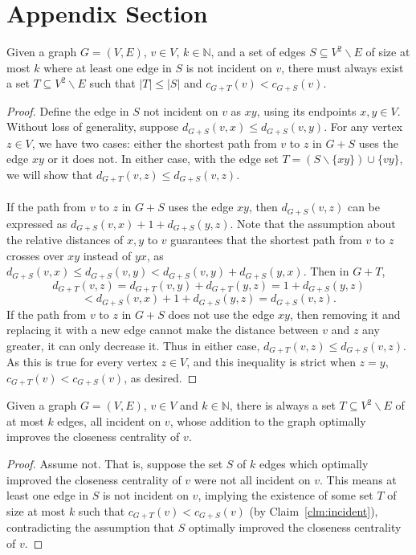 \section{Appendix Section}
\begin{claim} \label{clm:incident}
    Given a graph $G=(V,E)$, $v\in V$, $k\in\mathbb{N}$, and a set of edges $S\subseteq V^2\backslash E$ of size at most $k$ where at least one edge in $S$ is not incident on $v$, there must always exist a set $T\subseteq V^2\backslash E$ such that $|T|\leq|S|$ and $c_{G+T}(v)<c_{G+S}(v)$.
\end{claim}
\begin{proof}
    Define the edge in $S$ not incident on $v$ as $xy$, using its endpoints $x,y\in V$. Without loss of generality, suppose $d_{G+S}(v,x)\leq d_{G+S}(v,y)$. For any vertex $z\in V$, we have two cases: either the shortest path from $v$ to $z$ in $G+S$ uses the edge $xy$ or it does not. In either case, with the edge set $T=(S\backslash\{xy\})\cup\{vy\}$, we will show that $d_{G+T}(v,z)\leq d_{G+S}(v,z)$.\\\\
    If the path from $v$ to $z$ in $G+S$ uses the edge $xy$, then $d_{G+S}(v,z)$ can be expressed as $d_{G+S}(v,x)+1+d_{G+S}(y,z)$. Note that the assumption about the relative distances of $x,y$ to $v$ guarantees that the shortest path from $v$ to $z$ crosses over $xy$ instead of $yx$, as $d_{G+S}(v,x)\leq d_{G+S}(v,y)<d_{G+S}(v,y)+d_{G+S}(y,x)$. Then in $G+T$,
    \[d_{G+T}(v,z)=d_{G+T}(v,y)+d_{G+T}(y,z)=1+d_{G+S}(y,z)\]\[<d_{G+S}(v,x)+1+d_{G+S}(y,z)=d_{G+S}(v,z).\]
    If the path from $v$ to $z$ in $G+S$ does not use the edge $xy$, then removing it and replacing it with a new edge cannot make the distance between $v$ and $z$ any greater, it can only decrease it. Thus in either case, $d_{G+T}(v,z)\leq d_{G+S}(v,z)$. As this is true for every vertex $z\in V$, and this inequality is strict when $z=y$, $c_{G+T}(v)<c_{G+S}(v)$, as desired.
\end{proof}

\begin{lemma} \label{lem:incident}
    Given a graph $G=(V,E)$, $v\in V$ and $k\in\mathbb{N}$, there is always a set $T\subseteq V^2\backslash E$ of at most $k$ edges, all incident on $v$, whose addition to the graph optimally improves the closeness centrality of $v$.  
\end{lemma}
\begin{proof}
    Assume not. That is, suppose the set $S$ of $k$ edges which optimally improved the closeness centrality of $v$ were not all incident on $v$. This means at least one edge in $S$ is not incident on $v$, implying the existence of some set $T$ of size at most $k$ such that $c_{G+T}(v)<c_{G+S}(v)$ (by Claim~\ref{clm:incident}), contradicting the assumption that $S$ optimally improved the closeness centrality of $v$.
\end{proof}


